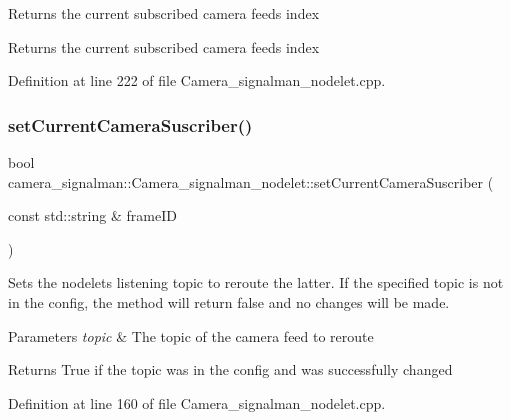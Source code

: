 Returns the current subscribed camera feed\textquotesingle{}s index \begin{DoxyReturn}{Returns}
the current subscribed camera feed\textquotesingle{}s index 
\end{DoxyReturn}


Definition at line 222 of file Camera\+\_\+signalman\+\_\+nodelet.\+cpp.

\mbox{\label{classcamera__signalman_1_1Camera__signalman__nodelet_abbc3105ad2d75df884e7f62a40cecb87}} 
\subsubsection{\texorpdfstring{setCurrentCameraSuscriber()}{setCurrentCameraSuscriber()}\hspace{0.1cm}{\footnotesize\ttfamily [1/2]}}
{\footnotesize\ttfamily bool camera\+\_\+signalman\+::\+Camera\+\_\+signalman\+\_\+nodelet\+::set\+Current\+Camera\+Suscriber (\begin{DoxyParamCaption}\item[{const std\+::string \&}]{frame\+ID }\end{DoxyParamCaption})}

Sets the nodelet\textquotesingle{}s listening topic to reroute the latter. If the specified topic is not in the config, the method will return false and no changes will be made. 
\begin{DoxyParams}{Parameters}
{\em topic} & The topic of the camera feed to reroute \\
\hline
\end{DoxyParams}
\begin{DoxyReturn}{Returns}
True if the topic was in the config and was successfully changed 
\end{DoxyReturn}


Definition at line 160 of file Camera\+\_\+signalman\+\_\+nodelet.\+cpp.

\mbox{\label{classcamera__signalman_1_1Camera__signalman__nodelet_a04659efde343f9690deca8425f3c9c37}} 
